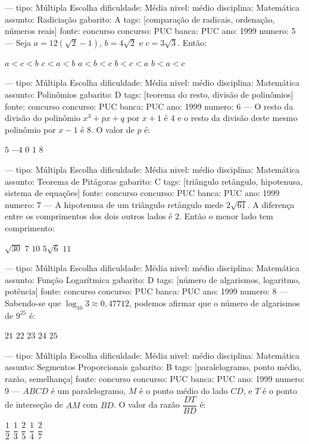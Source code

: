 ---
tipo: Múltipla Escolha
dificuldade: Média
nivel: médio
disciplina: Matemática
assunto: Radiciação
gabarito: A
tags: [comparação de radicais, ordenação, números reais]
fonte: concurso
concurso: PUC
banca: PUC
ano: 1999
numero: 5
---
\question
Seja $a = 12(\sqrt{2}-1)$, $b = 4\sqrt{2}$ e $c = 3\sqrt{3}$. Então:
\begin{choices}
\CorrectChoice $a < c < b$
\choice $c < a < b$
\choice $a < b < c$
\choice $b < c < a$
\choice $b < a < c$
\end{choices}

---
tipo: Múltipla Escolha
dificuldade: Média
nivel: médio
disciplina: Matemática
assunto: Polinômios
gabarito: D
tags: [teorema do resto, divisão de polinômios]
fonte: concurso
concurso: PUC
banca: PUC
ano: 1999
numero: 6
---
\question
O resto da divisão do polinômio $x^3 + px + q$ por $x + 1$ é $4$ e o resto da divisão deste mesmo polinômio por $x - 1$ é $8$. O valor de $p$ é:
\begin{choices}
\choice $5$
\choice $-4$
\choice $0$
\CorrectChoice $1$
\choice $8$
\end{choices}

---
tipo: Múltipla Escolha
dificuldade: Média
nivel: médio
disciplina: Matemática
assunto: Teorema de Pitágoras
gabarito: C
tags: [triângulo retângulo, hipotenusa, sistema de equações]
fonte: concurso
concurso: PUC
banca: PUC
ano: 1999
numero: 7
---
\question
A hipotenusa de um triângulo retângulo mede $2\sqrt{61}$. A diferença entre os comprimentos dos dois outros lados é $2$. Então o menor lado tem comprimento:
\begin{choices}
\choice $\sqrt{30}$
\choice $7$
\CorrectChoice $10$
\choice $5\sqrt{6}$
\choice $11$
\end{choices}

---
tipo: Múltipla Escolha
dificuldade: Média
nivel: médio
disciplina: Matemática
assunto: Função Logarítmica
gabarito: D
tags: [número de algarismos, logaritmo, potência]
fonte: concurso
concurso: PUC
banca: PUC
ano: 1999
numero: 8
---
\question
Sabendo-se que $\log_{10} 3 \approx 0{,}47712$, podemos afirmar que o número de algarismos de $9^{25}$ é:
\begin{choices}
\choice $21$
\choice $22$
\choice $23$
\CorrectChoice $24$
\choice $25$
\end{choices}

---
tipo: Múltipla Escolha
dificuldade: Média
nivel: médio
disciplina: Matemática
assunto: Segmentos Proporcionais
gabarito: B
tags: [paralelogramo, ponto médio, razão, semelhança]
fonte: concurso
concurso: PUC
banca: PUC
ano: 1999
numero: 9
---
\question
$ABCD$ é um paralelogramo, $M$ é o ponto médio do lado $CD$, e $T$ é o ponto de interseção de $AM$ com $BD$. O valor da razão $\dfrac{DT}{BD}$ é:
\begin{choices}
\choice $\dfrac{1}{2}$
\CorrectChoice $\dfrac{1}{3}$
\choice $\dfrac{2}{5}$
\choice $\dfrac{1}{4}$
\choice $\dfrac{2}{7}$
\end{choices}

